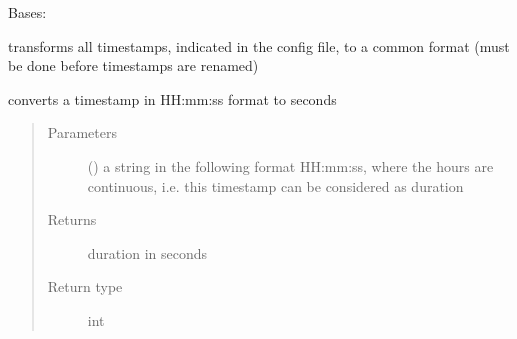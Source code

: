 \documentclass[letterpaper,10pt,english]{sphinxmanual}
\begin{document}

\begin{fulllineitems}
\label{\detokenize{event_log_analyzer:event_log_analyzer.adapter.TimestampModifier}}
\sphinxAtStartPar
Bases: {\hyperref[\detokenize{event_log_analyzer:event_log_analyzer.adapter.Adapter}]{}}

\sphinxAtStartPar
transforms all timestamps, indicated in the config file, to a common format (must be done before timestamps are renamed)

\begin{fulllineitems}
\label{\detokenize{event_log_analyzer:event_log_analyzer.adapter.TimestampModifier.get_sec}}
\sphinxAtStartPar
converts a timestamp in HH:mm:ss format to seconds
\begin{quote}\begin{description}
\item[{Parameters}] \leavevmode
\sphinxAtStartPar
{} () \textendash{} a string in the following format HH:mm:ss, where the hours are continuous, i.e. this timestamp can be considered as duration

\item[{Returns}] \leavevmode
\sphinxAtStartPar
duration in seconds

\item[{Return type}] \leavevmode
\sphinxAtStartPar
int

\end{description}\end{quote}

\end{fulllineitems}



\end{fulllineitems}
\end{document}
